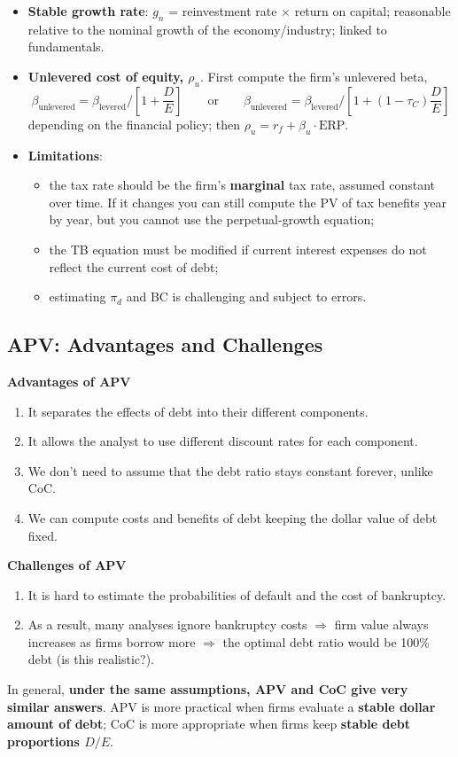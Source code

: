 \begin{itemize}
  \item \textbf{Stable growth rate}: $g_n$ = reinvestment rate $\times$ return on capital; reasonable relative to the nominal growth of the economy/industry; linked to fundamentals.
  \item \textbf{Unlevered cost of equity, $\rho_u$}. First compute the firm's unlevered beta,
  \[
  \beta_{\text{unlevered}}=\beta_{\text{levered}}\Big/\left[1+\frac{D}{E}\right]\qquad\text{or}\qquad \beta_{\text{unlevered}}=\beta_{\text{levered}}\Big/\left[1+(1-\tau_C)\frac{D}{E}\right]
  \]
  depending on the financial policy; then \quad $\rho_u=r_f+\beta_u\cdot\text{ERP}$.
  \item \textbf{Limitations}:
  \begin{itemize}
    \item the tax rate should be the firm's \textbf{marginal} tax rate, assumed constant over time. If it changes you can still compute the PV of tax benefits year by year, but you cannot use the perpetual-growth equation;
    \item the TB equation must be modified if current interest expenses do not reflect the current cost of debt;
    \item estimating $\pi_d$ and BC is challenging and subject to errors.
  \end{itemize}
\end{itemize}

\subsection[APV: Advantages and Challenges]{APV: Advantages and Challenges }

\textbf{Advantages of APV}
\begin{enumerate}[label=(\roman*)]
  \item It separates the effects of debt into their different components.
  \item It allows the analyst to use different discount rates for each component.
  \item We don't need to assume that the debt ratio stays constant forever, unlike CoC.
  \item We can compute costs and benefits of debt keeping the dollar value of debt fixed.
\end{enumerate}
\textbf{Challenges of APV}
\begin{enumerate}[label=(\roman*)]
  \item It is hard to estimate the probabilities of default and the cost of bankruptcy.
  \item As a result, many analyses ignore bankruptcy costs $\Rightarrow$ firm value always increases as firms borrow more $\Rightarrow$ the optimal debt ratio would be 100\% debt (is this realistic?).
\end{enumerate}
\begin{keybox}
In general, \textbf{under the same assumptions, APV and CoC give very similar answers}. APV is more practical when firms evaluate a \textbf{stable dollar amount of debt}; CoC is more appropriate when firms keep \textbf{stable debt proportions $D/E$}.
\end{keybox}

